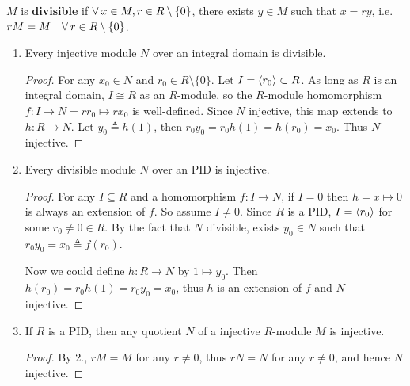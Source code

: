 \begin{definition}
  $M$ is {\bf divisible} if $\forall x\in M, r \in R \setminus \set{0}$, there exists
  $y \in M$ such that $x = ry$, i.e. $rM = M \quad \forall r \in R \setminus \set{0}$.
\end{definition}

\begin{prop} \mbox{} \label{prop:injective-and-divisible}
  \begin{enumerate}
    \item Every injective module $N$ over an integral domain is divisible.
      \begin{proof}
        For any $x_0 \in N$ and $r_0 \in R \setminus \{0\}$. Let
        $I = \langle r_0\rangle \subset R$. As long as $R$ is an integral domain,
        $I \cong R$ as an $R$-module, so the $R$-module homomorphism
        $f : I \to N = r r_0 \mapsto r x_0$ is well-defined.
        Since $N$ injective, this map extends to $h : R \to N$.
        Let $y_0 \triangleq h(1)$, then $r_0 y_0 = r_0 h(1) = h(r_0) = x_0$.
        Thus $N$ injective.
      \end{proof}
    \item Every divisible module $N$ over an PID is injective.
      \begin{proof}
        For any $I \subseteq R$ and a homomorphism $f : I \to N$, if $I = 0$ then
        $h = x \mapsto 0$ is always an extension of $f$.
        So assume $I \neq 0$. Since $R$ is a PID,
        $I = \langle r_0\rangle$ for some $r_0 \neq 0 \in R$.
        By the fact that $N$ divisible, exists $y_0 \in N$
        such that $r_0 y_0 = x_0 \triangleq f(r_0)$.

        Now we could define $h : R \to N$ by $1 \mapsto y_0$.
        Then $h(r_0) = r_0 h(1) = r_0 y_0 = x_0$, thus
        $h$ is an extension of $f$ and $N$ injective.
     \end{proof}
     \item If $R$ is a PID, then any quotient $N$ of a injective $R$-module $M$
       is injective.
       \begin{proof}
        By 2., $rM = M$ for any $r \neq 0$, thus $rN = N$ for any $r \neq 0$,
        and hence $N$ injective.
       \end{proof}
  \end{enumerate}
\end{prop}

